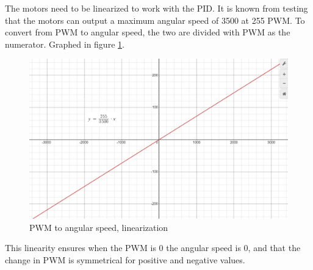 The motors need to be linearized to work with the PID. It is known from testing that the motors can output a maximum angular speed of 3500 at 255 PWM. To convert from PWM to angular speed, the two are divided with PWM as the numerator. Graphed in figure \ref{fig:graphlin}.

\begin{figure}[H]
\begin{center}
   \includegraphics[width=\textwidth]{pictures/control/Linearization.png}
  
\end{center}
\caption{PWM to angular speed, linearization}
\label{fig:graphlin}
\end{figure}

This linearity ensures when the PWM is 0 the angular speed is 0, and that the change in PWM is symmetrical for positive and negative values.